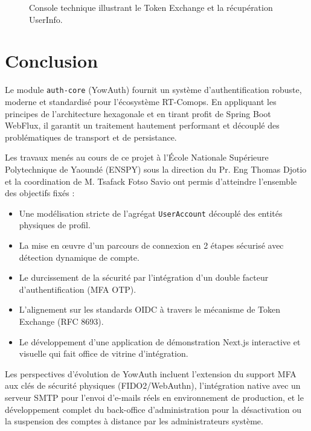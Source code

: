 \documentclass[11pt,a4paper,oneside]{report}
\newcommand{\code}[1]{\texttt{\small #1}}
\begin{document}
\begin{figure}[h]
  \centering
  \caption{Console technique illustrant le Token Exchange et la récupération UserInfo.}
  \label{fig:poc-sso-modal}
\end{figure}

\chapter{Conclusion}
Le module \code{auth-core} (YowAuth) fournit un système d'authentification robuste, moderne et standardisé pour l'écosystème RT-Comops. En appliquant les principes de l'architecture hexagonale et en tirant profit de Spring Boot WebFlux, il garantit un traitement hautement performant et découplé des problématiques de transport et de persistance.

Les travaux menés au cours de ce projet à l'École Nationale Supérieure Polytechnique de Yaoundé (ENSPY) sous la direction du Pr. Eng Thomas Djotio et la coordination de M. Tsafack Fotso Savio ont permis d'atteindre l'ensemble des objectifs fixés :
\begin{itemize}
  \item Une modélisation stricte de l'agrégat \code{UserAccount} découplé des entités physiques de profil.
  \item La mise en œuvre d'un parcours de connexion en 2 étapes sécurisé avec détection dynamique de compte.
  \item Le durcissement de la sécurité par l'intégration d'un double facteur d'authentification (MFA OTP).
  \item L'alignement sur les standards OIDC à travers le mécanisme de Token Exchange (RFC 8693).
  \item Le développement d'une application de démonstration Next.js interactive et visuelle qui fait office de vitrine d'intégration.
\end{itemize}

Les perspectives d'évolution de YowAuth incluent l'extension du support MFA aux clés de sécurité physiques (FIDO2/WebAuthn), l'intégration native avec un serveur SMTP pour l'envoi d'e-mails réels en environnement de production, et le développement complet du back-office d'administration pour la désactivation ou la suspension des comptes à distance par les administrateurs système.
\end{document}
